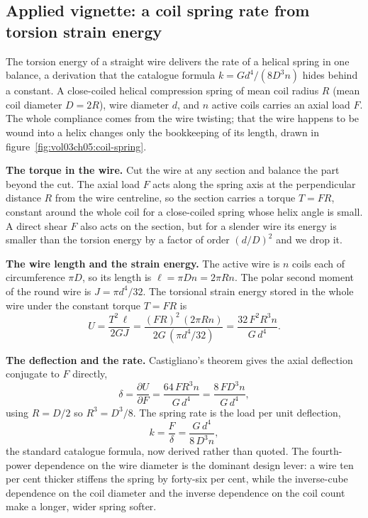 \subsection{Applied vignette: a coil spring rate from torsion strain
energy}

The torsion energy of a straight wire delivers the rate of a helical
spring in one balance, a derivation that the catalogue formula
$k = Gd^4/(8D^3 n)$ hides behind a constant. A close-coiled helical
compression spring of mean coil radius $R$ (mean coil diameter $D = 2R$),
wire diameter $d$, and $n$ active coils carries an axial load $F$. The
whole compliance comes from the wire twisting; that the wire happens to be
wound into a helix changes only the bookkeeping of its length, drawn in
figure~\ref{fig:vol03ch05:coil-spring}.



\textbf{The torque in the wire.} Cut the wire at any section and balance
the part beyond the cut. The axial load $F$ acts along the spring axis at
the perpendicular distance $R$ from the wire centreline, so the section
carries a torque $T = FR$, constant around the whole coil for a
close-coiled spring whose helix angle is small. A direct shear $F$ also
acts on the section, but for a slender wire its energy is smaller than the
torsion energy by a factor of order $(d/D)^2$ and we drop it.

\textbf{The wire length and the strain energy.} The active wire is $n$
coils each of circumference $\pi D$, so its length is $\ell = \pi D n =
2\pi R n$. The polar second moment of the round wire is $J = \pi d^4/32$.
The torsional strain energy stored in the whole wire under the constant
torque $T = FR$ is
\[
U = \frac{T^2\,\ell}{2GJ}
= \frac{(FR)^2\,(2\pi R n)}{2G\,(\pi d^4/32)}
= \frac{32\,F^2 R^3 n}{G\,d^4}.
\]

\textbf{The deflection and the rate.} Castigliano's theorem gives the
axial deflection conjugate to $F$ directly,
\[
\delta = \frac{\partial U}{\partial F}
= \frac{64\,F R^3 n}{G\,d^4}
= \frac{8\,F D^3 n}{G\,d^4},
\]
using $R = D/2$ so $R^3 = D^3/8$. The spring rate is the load per unit
deflection,
\[
k = \frac{F}{\delta} = \frac{G\,d^4}{8\,D^3 n},
\]
the standard catalogue formula, now derived rather than quoted. The
fourth-power dependence on the wire diameter is the dominant design lever:
a wire ten per cent thicker stiffens the spring by forty-six per cent,
while the inverse-cube dependence on the coil diameter and the inverse
dependence on the coil count make a longer, wider spring softer.

